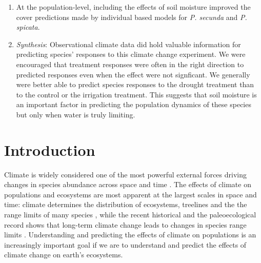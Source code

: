 \documentclass[11pt]{article}
\begin{document}
\begin{doublespacing}
\begin{enumerate}
\item At the population-level, including the effects of soil moisture improved the cover predictions made by individual based models for \textit{P. secunda} and \textit{P. spicata}.   
\item \emph{Synthesis}: Observational climate data did hold valuable information for predicting species' responses to this climate change experiment. We were encouraged that treatment responses were often in the right direction to predicted responses even when the effect were not signficant. We generally were better able to predict species responses to the drought treatment than to the control or the irrigation treatment. This suggests that soil moisture is an important factor in predicting the population dynamics of these species but only when water is truly limiting.
  

\end{enumerate}


\section*{Introduction}

Climate is widely considered one of the most powerful external forces driving changes in species abundance across space and time \citep{teller_linking_2016}.  The effects of climate on populations and ecosystems are most apparent at the largest scales in space and time: climate determines the distribution of ecosystems, treelines and the the range limits of many species \citep{}, while the recent historical and the paleoecological record shows that long-term climate change leads to changes in species range limits \citep{parmesan, davis}. Understanding and predicting the effects of climate on populations is an increasingly important goal if we are to understand and predict the effects of climate change on earth's ecosystems. 


\end{doublespacing}
\end{document}
